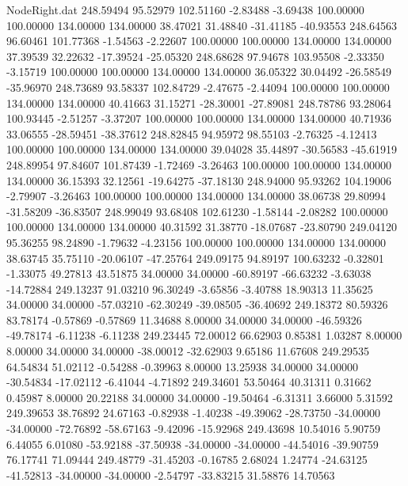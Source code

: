\begin{filecontents}{NodeRight.dat}
 248.59494   95.52979  102.51160    -2.83488   -3.69438  100.00000  100.00000  134.00000  134.00000   38.47021   31.48840  -31.41185  -40.93553
 248.64563   96.60461  101.77368    -1.54563   -2.22607  100.00000  100.00000  134.00000  134.00000   37.39539   32.22632  -17.39524  -25.05320
 248.68628   97.94678  103.95508    -2.33350   -3.15719  100.00000  100.00000  134.00000  134.00000   36.05322   30.04492  -26.58549  -35.96970
 248.73689   93.58337  102.84729    -2.47675   -2.44094  100.00000  100.00000  134.00000  134.00000   40.41663   31.15271  -28.30001  -27.89081
 248.78786   93.28064  100.93445    -2.51257   -3.37207  100.00000  100.00000  134.00000  134.00000   40.71936   33.06555  -28.59451  -38.37612
 248.82845   94.95972   98.55103    -2.76325   -4.12413  100.00000  100.00000  134.00000  134.00000   39.04028   35.44897  -30.56583  -45.61919
 248.89954   97.84607  101.87439    -1.72469   -3.26463  100.00000  100.00000  134.00000  134.00000   36.15393   32.12561  -19.64275  -37.18130
 248.94000   95.93262  104.19006    -2.79907   -3.26463  100.00000  100.00000  134.00000  134.00000   38.06738   29.80994  -31.58209  -36.83507
 248.99049   93.68408  102.61230    -1.58144   -2.08282  100.00000  100.00000  134.00000  134.00000   40.31592   31.38770  -18.07687  -23.80790
 249.04120   95.36255   98.24890    -1.79632   -4.23156  100.00000  100.00000  134.00000  134.00000   38.63745   35.75110  -20.06107  -47.25764
 249.09175   94.89197  100.63232    -0.32801   -1.33075   49.27813   43.51875   34.00000   34.00000  -60.89197  -66.63232   -3.63038  -14.72884
 249.13237   91.03210   96.30249    -3.65856   -3.40788   18.90313   11.35625   34.00000   34.00000  -57.03210  -62.30249  -39.08505  -36.40692
 249.18372   80.59326   83.78174    -0.57869   -0.57869   11.34688    8.00000   34.00000   34.00000  -46.59326  -49.78174   -6.11238   -6.11238
 249.23445   72.00012   66.62903     0.85381    1.03287    8.00000    8.00000   34.00000   34.00000  -38.00012  -32.62903    9.65186   11.67608
 249.29535   64.54834   51.02112    -0.54288   -0.39963    8.00000   13.25938   34.00000   34.00000  -30.54834  -17.02112   -6.41044   -4.71892
 249.34601   53.50464   40.31311     0.31662    0.45987    8.00000   20.22188   34.00000   34.00000  -19.50464   -6.31311    3.66000    5.31592
 249.39653   38.76892   24.67163    -0.82938   -1.40238  -49.39062  -28.73750  -34.00000  -34.00000  -72.76892  -58.67163   -9.42096  -15.92968
 249.43698   10.54016    5.90759     6.44055    6.01080  -53.92188  -37.50938  -34.00000  -34.00000  -44.54016  -39.90759   76.17741   71.09444
 249.48779  -31.45203   -0.16785     2.68024    1.24774  -24.63125  -41.52813  -34.00000  -34.00000   -2.54797  -33.83215   31.58876   14.70563

\end{filecontents}
